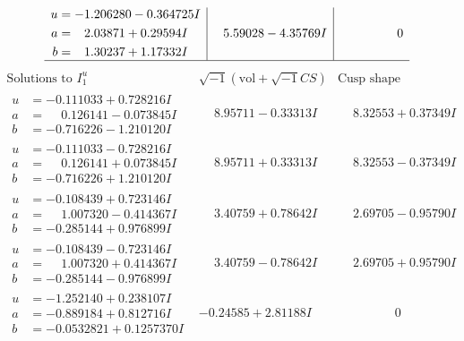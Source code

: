 \documentclass[1p]{elsarticle_modified}
\theoremstyle{definition}
\newcommand{\I}{\sqrt{-1}}
\begin{document}
$$\begin{array}{c|c|c}
\begin{aligned}
u &= -1.206280 - 0.364725 I \\
a &= \phantom{-}2.03871 + 0.29594 I \\
b &= \phantom{-}1.30237 + 1.17332 I\end{aligned}
 & \phantom{-}5.59028 - 4.35769 I & \phantom{-0.000000 } 0\\
 \hline 
 \end{array}$$\newpage$$\begin{array}{c|c|c}  
\text{Solutions to }I^u_{1}& \I (\text{vol} + \sqrt{-1}CS) & \text{Cusp shape}\\
 \hline 
\begin{aligned}
u &= -0.111033 + 0.728216 I \\
a &= \phantom{-}0.126141 - 0.073845 I \\
b &= -0.716226 - 1.210120 I\end{aligned}
 & \phantom{-}8.95711 - 0.33313 I & \phantom{-}8.32553 + 0.37349 I \\ \hline\begin{aligned}
u &= -0.111033 - 0.728216 I \\
a &= \phantom{-}0.126141 + 0.073845 I \\
b &= -0.716226 + 1.210120 I\end{aligned}
 & \phantom{-}8.95711 + 0.33313 I & \phantom{-}8.32553 - 0.37349 I \\ \hline\begin{aligned}
u &= -0.108439 + 0.723146 I \\
a &= \phantom{-}1.007320 - 0.414367 I \\
b &= -0.285144 + 0.976899 I\end{aligned}
 & \phantom{-}3.40759 + 0.78642 I & \phantom{-}2.69705 - 0.95790 I \\ \hline\begin{aligned}
u &= -0.108439 - 0.723146 I \\
a &= \phantom{-}1.007320 + 0.414367 I \\
b &= -0.285144 - 0.976899 I\end{aligned}
 & \phantom{-}3.40759 - 0.78642 I & \phantom{-}2.69705 + 0.95790 I \\ \hline\begin{aligned}
u &= -1.252140 + 0.238107 I \\
a &= -0.889184 + 0.812716 I \\
b &= -0.0532821 + 0.1257370 I\end{aligned}
 & -0.24585 + 2.81188 I & \phantom{-0.000000 } 0 \\ \hline\begin{aligned}

\end{aligned}
\end{array}$$
\end{document}
